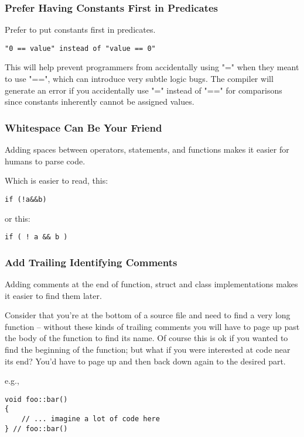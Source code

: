 \subsubsection{Prefer Having Constants First in Predicates}
Prefer to put constants first in predicates. 

\begin{verbatim}
"0 == value" instead of "value == 0"
\end{verbatim}

This will help prevent programmers from accidentally using "=" when they meant
to use "==", which can introduce very subtle logic bugs.  The compiler will
generate an error if you accidentally use "=" instead of "==" for comparisons
since constants inherently cannot be assigned values.

\subsubsection{Whitespace Can Be Your Friend}
Adding spaces between operators, statements, and functions makes it easier for
humans to parse code.

Which is easier to read, this:

\begin{verbatim}
if (!a&&b)
\end{verbatim}

or this:

\begin{verbatim}
if ( ! a && b )
\end{verbatim}

\subsubsection{Add Trailing Identifying Comments}
Adding comments at the end of function, struct and class implementations makes
it easier to find them later.

Consider that you're at the bottom of a source file and need to find a very
long function -- without these kinds of trailing comments you will have to page
up past the body of the function to find its name.  Of course this is ok if you
wanted to find the beginning of the function; but what if you were interested
at code near its end?  You'd have to page up and then back down again to the
desired part.

e.g.,

\begin{verbatim}
void foo::bar()
{ 
    // ... imagine a lot of code here 
} // foo::bar()
\end{verbatim}

